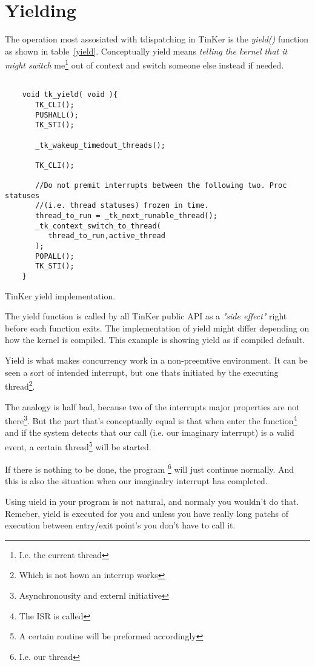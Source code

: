 \section{Yielding}
	The operation most assosiated with tdispatching in TinKer is the \textit{yield()} function as shown in table~\ref{yield}. Conceptually yield means \textit{telling the kernel that it might switch} me\footnote{I.e. the current thread} out of context and switch someone else instead if needed.
	\begin{table}[!hbp]
	\begin{verbatim}

	void tk_yield( void ){
	   TK_CLI();   
	   PUSHALL();   
	   TK_STI();

	   _tk_wakeup_timedout_threads();
   
	   TK_CLI();
   
	   //Do not premit interrupts between the following two. Proc statuses 
	   //(i.e. thread statuses) frozen in time.
	   thread_to_run = _tk_next_runable_thread();
	   _tk_context_switch_to_thread(
	      thread_to_run,active_thread
	   );   
	   POPALL();
	   TK_STI();
	}
	\end{verbatim}
	\caption{TinKer yield implementation.\label{yield}}
	\end{table}
	The yield function is called by all TinKer public API as a \textit{"side effect"} right before each function exits. The implementation of yield might differ depending on how the kernel is compiled. This example is showing yield as if compiled default. 

	Yield is what makes concurrency work in a non-preemtive environment. It can be seen a sort of intended interrupt, but one thats initiated by the executing thread\footnote{Which is not hown an interrup works}.

	The analogy is half bad, because two of the interrupts major properties are not there\footnote{Asynchronousity and externl initiative}. But the part that's conceptually equal is that when enter the function\footnote{The ISR is called} and if the system detects that our call (i.e. our imaginary interrupt) is a valid event, a certain thread\footnote{A certain routine will be preformed accordingly} will be started. 

	If there is nothing to be done, the program \footnote{I.e. our thread} will just continue normally. And this is also the situation when our imaginalry interrupt has completed.

	Using uield in your program is not natural, and normaly you wouldn't do that. Remeber, yield is executed for you and unless you have really long patchs of execution between entry/exit point's you don't have to call it.

